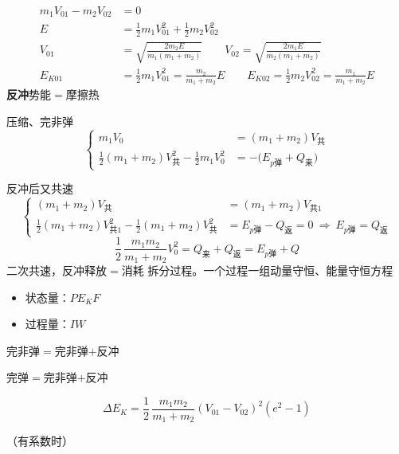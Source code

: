 \begin{align*}
m_1V_{01}-m_2V_{02}&=0 \\ %
E&=\tfrac12m_1V_{01}^2+\tfrac12m_2V_{02}^2\\
V_{01}&=\sqrt{\frac{2m_2E}{m_1(m_1+m_2)}}\qquad V_{02}=\sqrt{\frac{2m_1E}{m_2(m_1+m_2)}}\\
E_{K01}&=\tfrac12m_1V_{01}^2=\frac{m_2}{m_1+m_2}E\qquad E_{K02}=\tfrac12m_2V_{02}^2=\frac{m_1}{m_1+m_2}E %
\end{align*}
\textbf{反冲}\quad 势能$=$摩擦热

压缩、完非弹
\[
\left\{\begin{aligned}
m_1V_0&=(m_1+m_2)V_{\text{共}}\\
\tfrac12(m_1+m_2)V_{\text{共}}^2-\tfrac12m_1V_0^2&=-\bigl(E_{p\text{弹}}+Q_{\text{来}}\bigr)
\end{aligned}\right.
\]

反冲后又共速
\[
\left\{\begin{aligned}
(m_1+m_2)V_{\text{共}}&=(m_1+m_2)V_{\text{共}1}\\
\tfrac12(m_1+m_2)V_{\text{共}1}^2-\tfrac12(m_1+m_2)V_{\text{共}}^2&=E_{p\text{弹}}-Q_{\text{返}}=0\ \Rightarrow\ E_{p\text{弹}}=Q_{\text{返}}
\end{aligned}\right.
\]
\[
\frac12\,\frac{m_1m_2}{m_1+m_2}V_0^2=Q_{\text{来}}+Q_{\text{返}}=E_{p\text{弹}}+Q
\]
二次共速，反冲\quad 释放$=$消耗
拆分过程。一个过程一组动量守恒、能量守恒方程
\begin{itemize}
\item 状态量：$P$\quad $E_K$\quad $F$
\item 过程量：$I$\quad $W$
\end{itemize}

完非弹$=$完非弹$+$反冲 %

完弹$=$完非弹$+$反冲

\begin{keybox}
\[
\Delta E_K=\frac12\,\frac{m_1m_2}{m_1+m_2}(V_{01}-V_{02})^2(e^2-1)
\]
\end{keybox}
（有系数时）

